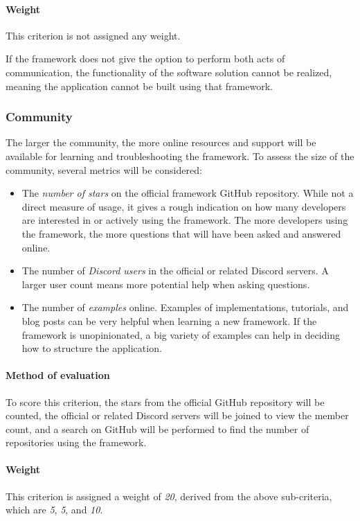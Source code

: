 \paragraph{Weight}
This criterion is not assigned any weight.

If the framework does not give the option to perform both acts of communication, the functionality of the software solution cannot be realized, meaning the application cannot be built using that framework.

\subsubsection{Community}\label{subsubsec:community}
The larger the community, the more online resources and support will be available for learning and troubleshooting the framework.
To assess the size of the community, several metrics will be considered:

\begin{itemize}
	\item The \emph{number of stars} on the official framework GitHub repository.
	      While not a direct measure of usage, it gives a rough indication on how many developers are interested in or actively using the framework.
	      The more developers using the framework, the more questions that will have been asked and answered online.
	\item The number of \emph{Discord users} in the official or related Discord servers.
	      A larger user count means more potential help when asking questions.
	\item The number of \emph{examples} online.
	      Examples of implementations, tutorials, and blog posts can be very helpful when learning a new framework.
	      If the framework is unopinionated, a big variety of examples can help in deciding how to structure the application.
\end{itemize}

\paragraph{Method of evaluation}
To score this criterion, the stars from the official GitHub repository will be counted, the official or related Discord servers will be joined to view the member count, and a search on GitHub will be performed to find the number of repositories using the framework.

\paragraph{Weight}
This criterion is assigned a weight of \emph{20}, derived from the above sub-criteria, which are \emph{5}, \emph{5}, and \emph{10}.

